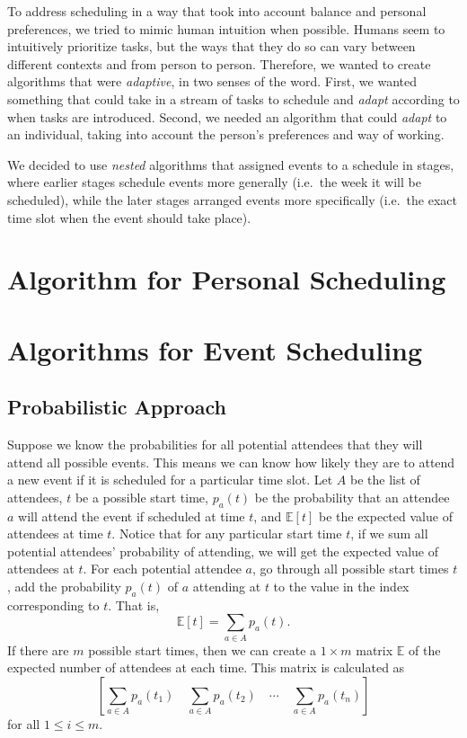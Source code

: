 \documentclass{article}
\newcommand{\todo}[1]{}
\begin{document}
	To address scheduling in a way that took into account balance and personal preferences, we tried to mimic human intuition when possible.
	Humans seem to intuitively prioritize tasks, but the ways that they do so can vary between different contexts and from person to person.
	Therefore, we wanted to create algorithms that were \emph{adaptive}, in two senses of the word.
	First, we wanted something that could take in a stream of tasks to schedule and \emph{adapt} according to when tasks are introduced.
	Second, we needed an algorithm that could \emph{adapt} to an individual, taking into account the person's preferences and way of working.

	We decided to use \emph{nested} algorithms that assigned events to a schedule in stages, where earlier stages schedule events more generally (i.e.~the week it will be scheduled), while the later stages arranged events more specifically (i.e.~the exact time slot when the event should take place).

\section{Algorithm for Personal Scheduling}


\section{Algorithms for Event Scheduling}

\subsection{Probabilistic Approach}
	Suppose we know the probabilities for all potential attendees that they will attend all possible events.
	This means we can know how likely they are to attend a new event if it is scheduled for a particular time slot.
	Let $A$ be the list of attendees, $t$ be a possible start time, $p_a(t)$ be the probability that an attendee $a$ will attend the event if scheduled at time $t$, and $\mathbb{E}[t]$ be the expected value of attendees at time $t$.
	Notice that for any particular start time $t$, if we sum all potential attendees' probability of attending, we will get the expected value of attendees at $t$.
	For each potential attendee $a$, go through all possible start times $t$, add the probability $p_a(t)$ of $a$ attending at $t$ to the value in the index corresponding to $t$.
	That is, 
	\[ \mathbb{E}[t] = \sum_{a \in A} p_a(t). \]
	If there are $m$ possible start times, then we can create a $1 \times m$ matrix $\mathbb{E}$ of the expected number of attendees at each time.
	This matrix is calculated as
	\[  \todo{``Fix matrix formatting''}
		\left[ \sum_{a \in A} p_a(t_1) \quad \sum_{a \in A} p_a(t_2) \quad  \cdots \quad \sum_{a \in A} p_a(t_n) \right]
	\]
	for all $1 \le i \le m$.
\end{document}
